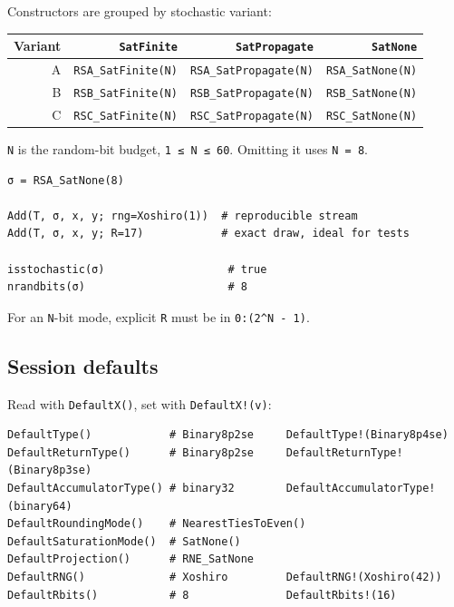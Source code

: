 \label{13387950688615589261}{}


Constructors are grouped by stochastic variant:




\begin{table}[h]
\centering
\begin{tabulary}{\linewidth}{R R R R}
\toprule
Variant & \texttt{SatFinite} & \texttt{SatPropagate} & \texttt{SatNone} \\
\toprule
A & \texttt{RSA\_SatFinite(N)} & \texttt{RSA\_SatPropagate(N)} & \texttt{RSA\_SatNone(N)} \\
B & \texttt{RSB\_SatFinite(N)} & \texttt{RSB\_SatPropagate(N)} & \texttt{RSB\_SatNone(N)} \\
C & \texttt{RSC\_SatFinite(N)} & \texttt{RSC\_SatPropagate(N)} & \texttt{RSC\_SatNone(N)} \\
\bottomrule
\end{tabulary}

\end{table}



\texttt{N} is the random-bit budget, \texttt{1 ≤ N ≤ 60}. Omitting it uses \texttt{N = 8}.




\begin{verbatim}
σ = RSA_SatNone(8)

Add(T, σ, x, y; rng=Xoshiro(1))  # reproducible stream
Add(T, σ, x, y; R=17)            # exact draw, ideal for tests

isstochastic(σ)                   # true
nrandbits(σ)                      # 8
\end{verbatim}



For an \texttt{N}-bit mode, explicit \texttt{R} must be in \texttt{0:(2{\textasciicircum}N - 1)}.



\subsection{Session defaults}



\label{3970345369238056532}{}


Read with \texttt{DefaultX()}, set with \texttt{DefaultX!(v)}:




\begin{verbatim}
DefaultType()            # Binary8p2se     DefaultType!(Binary8p4se)
DefaultReturnType()      # Binary8p2se     DefaultReturnType!(Binary8p3se)
DefaultAccumulatorType() # binary32        DefaultAccumulatorType!(binary64)
DefaultRoundingMode()    # NearestTiesToEven()
DefaultSaturationMode()  # SatNone()
DefaultProjection()      # RNE_SatNone
DefaultRNG()             # Xoshiro         DefaultRNG!(Xoshiro(42))
DefaultRbits()           # 8               DefaultRbits!(16)
\end{verbatim}



